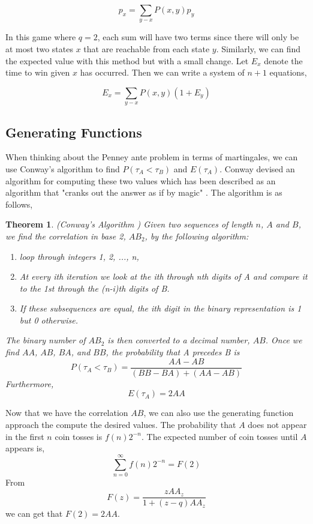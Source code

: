\documentclass{article}
\newtheorem{theorem}{Theorem}[section]
\numberwithin{mytheorem}{subsection} %
\begin{document}
			$$p_x = \sum_{y - x} P(x,y) p_y$$

			In this game where $q=2$, each sum will have two terms since there will only be at most two states $x$ that are reachable from each state $y$. Similarly, we can find the expected value with this method but with a small change. Let $E_x$ denote the time to win given $x$ has occurred. Then we can write a system of $n+1$ equations,

			$$E_x = \sum_{y - x} P(x,y) (1 + E_y)$$


		\subsection{Generating Functions}
			When thinking about the Penney ante problem in terms of martingales, we can use Conway's algorithm to find $P(\tau_A < \tau_B)$ and $E(\tau_A)$. Conway devised an algorithm for computing these two values which has been described as an algorithm that "cranks out the answer as if by magic" \cite{gardner}. The algorithm is as follows,

			\begin{theorem}(Conway's Algorithm \cite{gardner})
			Given two sequences of length $n$, $A$ and $B$, we find the correlation in base 2, $AB_2$, by the following algorithm:
			\begin{enumerate}
			\item loop through integers 1, 2, ..., n,
			\item At every ith iteration we look at the ith through nth digits of A and compare
			   it to the 1st through the (n-i)th digits of B.
			\item If these subsequences are equal, the ith digit in the binary representation is 1 but 0 otherwise.
			\end{enumerate} 

			The binary number of $AB_2$
			is then converted to a decimal number, $AB$. Once we find $AA$, $AB$,
			$BA$, and $BB$, the probability that A precedes B is
			$$P(\tau_A < \tau_B) = \frac{AA - AB}{(BB - BA) + (AA - AB)} $$
			Furthermore, 
			$$E(\tau_A) = 2AA $$ 
			\end{theorem}

			Now that we have the correlation $AB$, we can also use the generating function approach the compute the desired values. The probability that $A$ does not appear in the first $n$ coin tosses is $f(n)2^{-n}$. The expected number of coin tosses until $A$ appears is,
			$$\sum_{n=0}^\infty f(n) 2^{-n} = F(2)$$
			From 
			$$F(z) = \frac{zAA_z}{1+(z-q)AA_z}$$
			we can get that $F(2) = 2AA$. \cite{enumerate} \cite{gardner}
\end{document}
